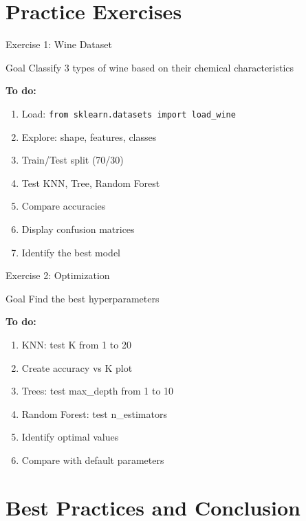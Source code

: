 \documentclass[aspectratio=169]{beamer}
\begin{document}
\section{Practice Exercises}

\begin{frame}{Exercise 1: Wine Dataset}
\begin{block}{Goal}
Classify 3 types of wine based on their chemical characteristics
\end{block}

\textbf{To do:}
\begin{enumerate}
    \item Load: \texttt{from sklearn.datasets import load\_wine}
    \item Explore: shape, features, classes
    \item Train/Test split (70/30)
    \item Test KNN, Tree, Random Forest
    \item Compare accuracies
    \item Display confusion matrices
    \item Identify the best model
\end{enumerate}
\end{frame}

\begin{frame}{Exercise 2: Optimization}
\begin{block}{Goal}
Find the best hyperparameters
\end{block}

\textbf{To do:}
\begin{enumerate}
    \item KNN: test K from 1 to 20
    \item Create accuracy vs K plot
    \item Trees: test max\_depth from 1 to 10
    \item Random Forest: test n\_estimators
    \item Identify optimal values
    \item Compare with default parameters
\end{enumerate}
\end{frame}



\section{Best Practices and Conclusion}
\end{document}
